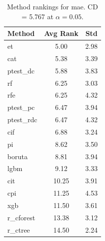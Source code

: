 \begin{table}[h]
\centering
\caption{Method rankings for mae. CD = 5.767 at $\alpha=0.05$.}
\label{tab:ranks_mae}
\begin{tabular}{lcc}
\toprule
Method & Avg Rank & Std \\
\midrule
et & 5.00 & 2.98 \\
cat & 5.38 & 3.39 \\
ptest_dc & 5.88 & 3.83 \\
rf & 6.25 & 3.03 \\
rfe & 6.25 & 4.32 \\
ptest_pc & 6.47 & 3.94 \\
ptest_rdc & 6.47 & 4.32 \\
cif & 6.88 & 3.24 \\
pi & 8.62 & 3.50 \\
boruta & 8.81 & 3.94 \\
lgbm & 9.12 & 3.33 \\
cit & 10.25 & 3.91 \\
cpi & 11.25 & 4.53 \\
xgb & 11.50 & 3.61 \\
r_cforest & 13.38 & 3.12 \\
r_ctree & 14.50 & 2.24 \\
\bottomrule
\end{tabular}
\end{table}